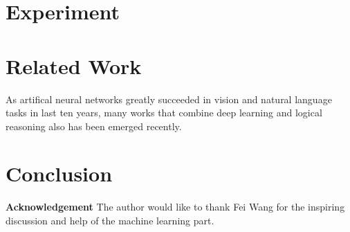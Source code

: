 \documentclass[sigplan,10pt]{acmart}\settopmatter{printfolios=true,printccs=false,printacmref=false}
\begin{document}
\section{Experiment}

\section{Related Work}

As artifical neural networks greatly succeeded in vision and natural language tasks in last ten years,
many works that combine deep learning and logical reasoning also has been emerged recently.

\section{Conclusion}

\textbf{Acknowledgement} The author would like to thank Fei Wang for the inspiring discussion and 
help of the machine learning part.

\clearpage{}







\end{document}
